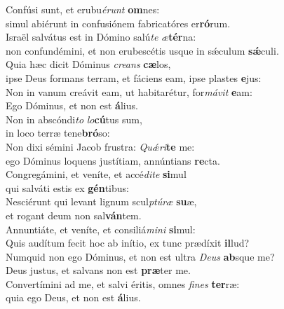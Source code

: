 \evenverse Confúsi sunt, et erubu\textit{é}\textit{runt} \textbf{om}nes:~\*\\
\evenverse simul abiérunt in confusiónem fabricatóres er\textbf{ró}rum.\\
\oddverse Israël salvátus est in Dómino salú\textit{te} \textit{æ}\textbf{tér}na:~\*\\
\oddverse non confundémini, et non erubescétis usque in sǽculum \textbf{sǽ}culi.\\
\evenverse Quia hæc dicit Dóminus \textit{cre}\textit{ans} \textbf{cæ}los,~\*\\
\evenverse ipse Deus formans terram, et fáciens eam, ipse plastes \textbf{e}jus:\\
\oddverse Non in vanum creávit eam, ut habitarétur, for\textit{má}\textit{vit} \textbf{e}am:~\*\\
\oddverse Ego Dóminus, et non est \textbf{á}lius.\\
\evenverse Non in abscóndi\textit{to} \textit{lo}\textbf{cú}tus sum,~\*\\
\evenverse in loco terræ tene\textbf{bró}so:\\
\oddverse Non dixi sémini Jacob frustra: \textit{Quǽ}\textit{ri}\textbf{te} me:~\*\\
\oddverse ego Dóminus loquens justítiam, annúntians \textbf{re}cta.\\
\evenverse Congregámini, et veníte, et accé\textit{di}\textit{te} \textbf{si}mul~\*\\
\evenverse qui salváti estis ex \textbf{gén}tibus:\\
\oddverse Nesciérunt qui levant lignum scul\textit{ptú}\textit{ræ} \textbf{su}æ,~\*\\
\oddverse et rogant deum non sal\textbf{ván}tem.\\
\evenverse Annuntiáte, et veníte, et consiliá\textit{mi}\textit{ni} \textbf{si}mul:~\*\\
\evenverse Quis audítum fecit hoc ab inítio, ex tunc prædíxit \textbf{il}lud?\\
\oddverse Numquid non ego Dóminus, et non est ultra \textit{De}\textit{us} \textbf{ab}sque me?~\*\\
\oddverse Deus justus, et salvans non est \textbf{præ}ter me.\\
\evenverse Convertímini ad me, et salvi éritis, omnes \textit{fi}\textit{nes} \textbf{ter}ræ:~\*\\
\evenverse quia ego Deus, et non est \textbf{á}lius.\\
